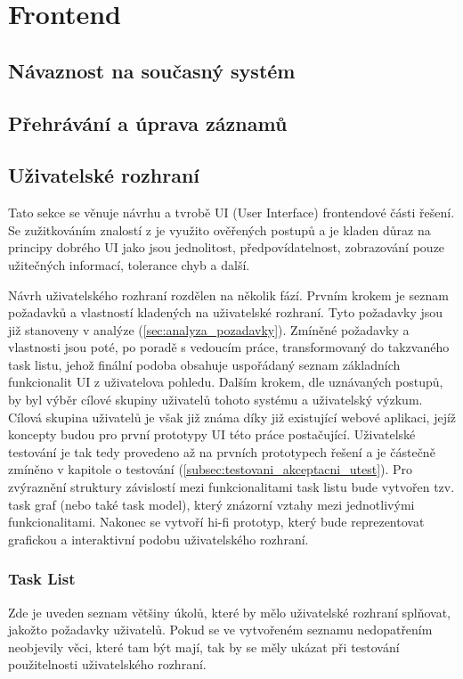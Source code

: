 \documentclass[thesis=M,czech]{FITthesis}[2012/06/26]
\begin{document}
\section{Frontend} \label{sec:navrh_frontend}
\subsection{Návaznost na současný systém}

\subsection{Přehrávání a úprava záznamů} %

\subsection{Uživatelské rozhraní}
Tato sekce se věnuje návrhu a tvrobě UI (User Interface) frontendové části řešení. Se zužitkováním znalostí z \cite{nur} je využito ověřených postupů a je kladen důraz na principy dobrého UI jako jsou jednolitost, předpovídatelnost, zobrazování pouze užitečných informací, tolerance chyb a další. 

Návrh uživatelského rozhraní rozdělen na několik fází. Prvním krokem je seznam požadavků a vlastností kladených na uživatelské rozhraní. Tyto požadavky jsou již stanoveny v analýze (\ref{sec:analyza_pozadavky}). Zmíněné požadavky a vlastnosti jsou poté, po poradě s vedoucím práce, transformovaný do takzvaného task listu, jehož finální podoba obsahuje uspořádaný seznam základních funkcionalit UI z uživatelova pohledu. Dalším krokem, dle uznávaných postupů, by byl výběr cílové skupiny uživatelů tohoto systému a uživatelský výzkum. Cílová skupina uživatelů je však již známa díky již existující webové aplikaci, jejíž koncepty budou pro první prototypy UI této práce postačující. Uživatelské testování je tak tedy provedeno až na prvních prototypech řešení a je částečně zmíněno v kapitole o testování (\ref{subsec:testovani_akceptacni_utest}). Pro zvýraznění struktury závislostí mezi funkcionalitami task listu bude vytvořen tzv. task graf (nebo také task model), který znázorní vztahy mezi jednotlivými funkcionalitami. Nakonec se vytvoří hi-fi prototyp, který bude reprezentovat grafickou a interaktivní podobu uživatelského rozhraní.

\subsubsection{Task List} \label{subsubsec:navrh_frontend_ui_tasklist}
Zde je uveden seznam většiny úkolů, které by mělo uživatelské rozhraní splňovat, jakožto požadavky uživatelů. Pokud se ve vytvořeném seznamu nedopatřením neobjevily věci, které tam být mají, tak by se měly ukázat při testování použitelnosti uživatelského rozhraní.
\end{document}
